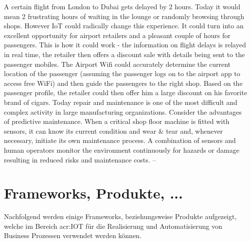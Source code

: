 A certain flight from London to Dubai gets delayed by 2 hours. Today it would mean 2 frustrating hours of waiting in the lounge or randomly browsing through shops. However IoT could radically change this experience. It could turn into an excellent opportunity for airport retailers and a pleasant couple of hours for passengers. This is how it could work - the information on flight delays is relayed in real time, the retailer then offers a discount sale with details being sent to the passenger mobiles. The Airport Wifi could accurately determine the current location of the passenger (assuming the passenger logs on to the airport app to access free WiFi) and then guide the passengers to the right shop. Based on the passenger profile, the retailer could then offer him a large discount on his favorite brand of cigars.
Today repair and maintenance is one of the most difficult and complex activity in large manufacturing organizations. Consider the advantages of predictive maintenance. When a critical shop floor machine is fitted with sensors, it can know its current condition and wear \& tear and, whenever necessary, initiate its own maintenance process. A combination of sensors and human operators monitor the environment continuously for hazards or damage resulting in reduced risks and maintenance costs.
--



\section{Frameworks, Produkte, ...}
Nachfolgend werden einige Frameworks, beziehungsweise Produkte aufgezeigt, welche im Bereich \gls{acr:IOT} für die Realisierung und Automatisierung von Business Prozessen verwendet werden können.

\begin{itemize}
\end{itemize}


